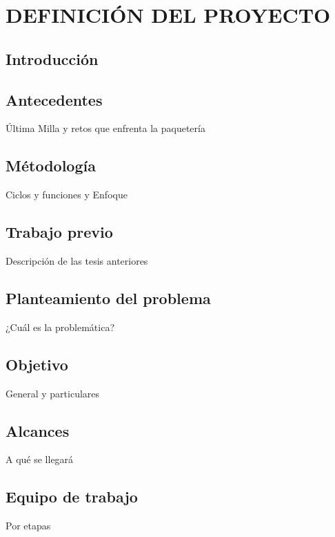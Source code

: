 \chapter{DEFINICIÓN DEL PROYECTO}
\section{Introducción}
\section{Antecedentes}
Última Milla y retos que enfrenta la paquetería
\section{Métodología}
Ciclos y funciones y Enfoque
\section{Trabajo previo}
Descripción de las tesis anteriores
\section{Planteamiento del problema}
¿Cuál es la problemática?
\section{Objetivo}
General y particulares
\section{Alcances}
A qué se llegará
\section{Equipo de trabajo}
Por etapas
